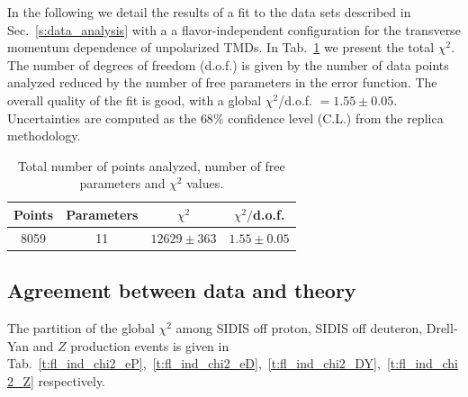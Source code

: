 \documentclass[aps,preprintnumbers,showpacs,nofootinbib,superscriptaddress,floatfix]{revtex4}
\begin{document}
In the following we detail the results of a fit to the data sets described in Sec.~\ref{s:data_analysis} with a a flavor-independent configuration for the transverse momentum dependence of unpolarized TMDs.
In Tab.~\ref{t:fl_ind_chi2} we present the total $\chi^2$. The number of degrees of freedom (d.o.f.) is given by the number of data points analyzed reduced by the number of free parameters in the error function. 
The overall quality of the fit is good, with a global $\chi^2$/d.o.f. $= 1.55 \pm 0.05$. Uncertainties are computed as the $68\%$ confidence level (C.L.) from the replica methodology. 
\begin{table}[h!]
\small
  \centering
  \begin{tabular}{|c|c|c|c|}
\hline
\hline
Points& Parameters & $\chi^2$& $\chi^2/$d.o.f. \\
\hline
8059 & 11  & $12629 \pm 363$ & $1.55 \pm 0.05$ \\
\hline
\hline
\end{tabular}
\caption{Total number of points analyzed, number of free parameters and $\chi^2$ values.}
\label{t:fl_ind_chi2}
\end{table}



\subsection{Agreement between data and theory}
\label{ss:data_vs_theory}

The partition of the global $\chi^2$ among SIDIS off proton, SIDIS off deuteron, Drell-Yan and $Z$ production events is given in Tab.~\ref{t:fl_ind_chi2_eP},~\ref{t:fl_ind_chi2_eD},~\ref{t:fl_ind_chi2_DY},~\ref{t:fl_ind_chi2_Z} respectively. 
\end{document}
